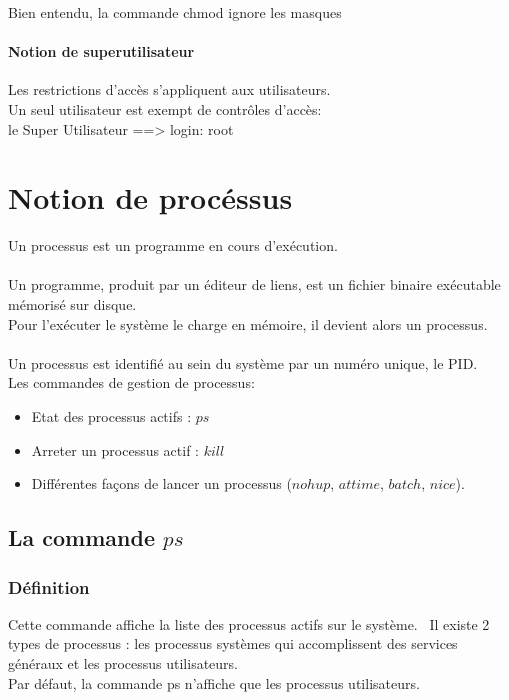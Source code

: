 					Bien entendu, la commande chmod ignore les masques
				\subsubsection{Notion de superutilisateur}
					Les restrictions d'accès s'appliquent aux utilisateurs.\\
					Un seul utilisateur est exempt de contrôles d'accès:\\
					le Super Utilisateur ==> login: root\\
	\chapter{Notion de procéssus}
		Un processus est un programme en cours d'exécution.\\ \\

		Un programme, produit par un éditeur de liens, est un fichier binaire exécutable mémorisé sur disque. \\
		Pour l'exécuter le système le charge en mémoire, il devient alors un processus.\\ \\

		Un processus est identifié au sein du système par un numéro unique, le PID.\\
		Les commandes de gestion de processus:\\
		\begin{itemize}
			\item Etat des processus actifs : $ps$
			\item Arreter un processus actif : $kill$
			\item Différentes façons de lancer un processus ($nohup$, $at time$, $batch$, $nice$).
		\end{itemize}
		\section{La commande $ps$}
			\subsection{Définition}
				Cette commande affiche la liste des processus actifs sur le système. \
				Il existe 2 types de processus : les processus systèmes qui accomplissent des services généraux et les processus utilisateurs. \\
				Par défaut, la commande ps n'affiche que les processus utilisateurs.\\
